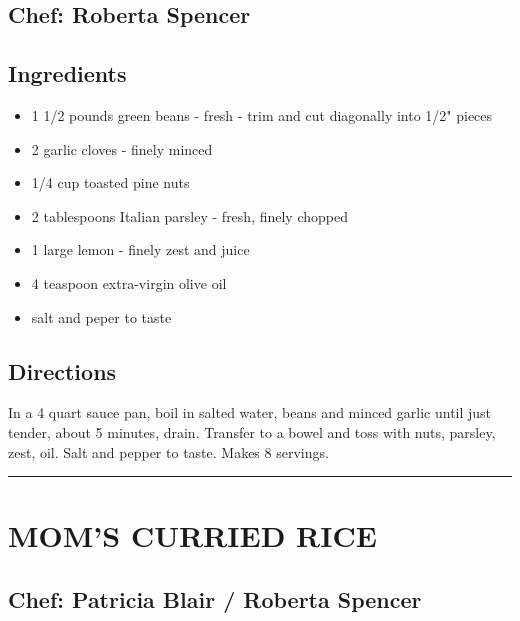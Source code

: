 \documentclass[
]{book}
\providecommand{\tightlist}{%
  \setlength{\itemsep}{0pt}\setlength{\parskip}{0pt}}
\begin{document}
\hypertarget{chef-roberta-spencer-7}{%
\subsection*{Chef: Roberta Spencer}\label{chef-roberta-spencer-7}}


\hypertarget{ingredients-32}{%
\subsection*{Ingredients}\label{ingredients-32}}


\begin{itemize}
\tightlist
\item
  1 1/2 pounds green beans - fresh - trim and cut diagonally into 1/2" pieces
\item
  2 garlic cloves - finely minced
\item
  1/4 cup toasted pine nuts
\item
  2 tablespoons Italian parsley - fresh, finely chopped
\item
  1 large lemon - finely zest and juice
\item
  4 teaspoon extra-virgin olive oil
\item
  salt and peper to taste
\end{itemize}

\hypertarget{directions-32}{%
\subsection*{Directions}\label{directions-32}}


In a 4 quart sauce pan, boil in salted water, beans and minced garlic until just tender, about 5 minutes, drain.
Transfer to a bowel and toss with nuts, parsley, zest, oil. Salt and pepper to taste. Makes 8 servings.

\begin{center}\rule{0.5\linewidth}{0.5pt}\end{center}

\hypertarget{moms-curried-rice}{%
\section*{MOM'S CURRIED RICE}\label{moms-curried-rice}}


\hypertarget{chef-patricia-blair-roberta-spencer}{%
\subsection*{Chef: Patricia Blair / Roberta Spencer}\label{chef-patricia-blair-roberta-spencer}}
\end{document}
